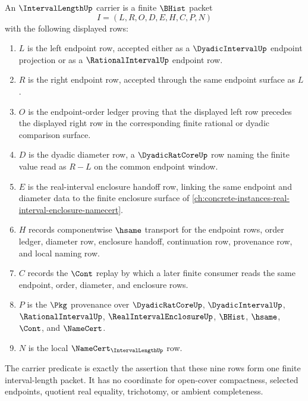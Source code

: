 \begin{definition}
\label{def:interval-length-carrier}
An $\IntervalLengthUp$ carrier is a finite $\BHist$ packet
$$
I=(L,R,O,D,E,H,C,P,N)
$$
with the following displayed rows:
\begin{enumerate}
\item $L$ is the left endpoint row, accepted either as a
$\DyadicIntervalUp$ endpoint projection or as a $\RationalIntervalUp$
endpoint row.
\item $R$ is the right endpoint row, accepted through the same endpoint
surface as $L$.
\item $O$ is the endpoint-order ledger proving that the displayed left row
precedes the displayed right row in the corresponding finite rational or
dyadic comparison surface.
\item $D$ is the dyadic diameter row, a $\DyadicRatCoreUp$ row naming the
finite value read as $R-L$ on the common endpoint window.
\item $E$ is the real-interval enclosure handoff row, linking the same
endpoint and diameter data to the finite enclosure surface of
\autoref{ch:concrete-instances-real-interval-enclosure-namecert}.
\item $H$ records componentwise $\hsame$ transport for the endpoint rows,
order ledger, diameter row, enclosure handoff, continuation row, provenance
row, and local naming row.
\item $C$ records the $\Cont$ replay by which a later finite consumer reads
the same endpoint, order, diameter, and enclosure rows.
\item $P$ is the $\Pkg$ provenance over $\DyadicRatCoreUp$,
$\DyadicIntervalUp$, $\RationalIntervalUp$,
$\RealIntervalEnclosureUp$, $\BHist$, $\hsame$, $\Cont$, and $\NameCert$.
\item $N$ is the local $\NameCert_{\IntervalLengthUp}$ row.
\end{enumerate}
The carrier predicate is exactly the assertion that these nine rows form one
finite interval-length packet. It has no coordinate for open-cover
compactness, selected endpoints, quotient real equality, trichotomy, or
ambient completeness.
\end{definition}

